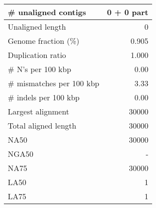 \documentclass[12pt,a4paper]{article}
\begin{document}
\begin{table}[ht]
\begin{center}
\begin{tabular}{|l*{1}{|r}|}
\# unaligned contigs & 0 + 0 part \\ \hline
Unaligned length & 0 \\ \hline
Genome fraction (\%) & 0.905 \\ \hline
Duplication ratio & 1.000 \\ \hline
\# N's per 100 kbp & 0.00 \\ \hline
\# mismatches per 100 kbp & 3.33 \\ \hline
\# indels per 100 kbp & 0.00 \\ \hline
Largest alignment & 30000 \\ \hline
Total aligned length & 30000 \\ \hline
NA50 & 30000 \\ \hline
NGA50 & - \\ \hline
NA75 & 30000 \\ \hline
LA50 & 1 \\ \hline
LA75 & 1 \\ \hline
\end{tabular}
\end{center}
\end{table}
\end{document}
